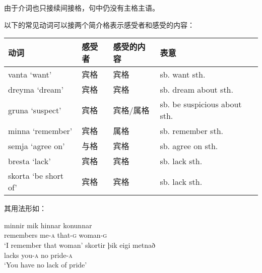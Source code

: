 \begin{enumerate}
\begin{enumerate}
                    由于介词也只接续间接格，句中仍没有主格主语。

                    以下的常见动词可以接两个简介格表示感受者和感受的内容：
                    \begin{table}[H]
                        \centering
                        \begin{tabular}{llll}
                            \toprule
                            动词                 & 感受者 & 感受的内容 & 表意                         \\
                            \midrule
                            vanta `want’         & 宾格   & 宾格       & sb. want sth.                \\
                            dreyma `dream’       & 宾格   & 宾格       & sb. dream about sth.         \\
                            gruna `suspect’      & 宾格   & 宾格/属格  & sb. be suspicious about sth. \\
                            minna `remember’     & 宾格   & 属格       & sb. remember sth.            \\
                            semja `agree on’     & 与格   & 宾格       & sb. agree on sth.            \\
                            bresta `lack’        & 宾格   & 宾格       & sb. lack sth.                \\
                            skorta `be short of’ & 宾格   & 宾格       & sb. lack sth.                \\
                            \bottomrule
                        \end{tabular}
                    \end{table}

                    其用法形如：
                    \begin{exe}
                        \ex \gll
                        minnir	mik	hinnar	konunnar\\
                        remembers	me-\textsc{a}	that-\textsc{g}	woman-\textsc{g}\\
                        \trans `I remember that woman’
                        \ex \gll
                        skortir	þik	eigi	metnað\\
                        lacks	you-\textsc{a}	no	pride-\textsc{a}\\
                        \trans `You have no lack of pride‌’
                    \end{exe}


\end{enumerate}
\end{enumerate}

